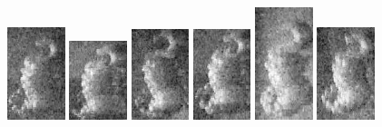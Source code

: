 \begin{figure}            
    \includegraphics[width=0.15\textwidth]{chapters/images/dataset/all-class-images/hook/hook-23.jpg}
    \includegraphics[width=0.15\textwidth]{chapters/images/dataset/all-class-images/hook/hook-32.jpg}    
    \includegraphics[width=0.15\textwidth]{chapters/images/dataset/all-class-images/hook/hook-8.jpg}
    \includegraphics[width=0.15\textwidth]{chapters/images/dataset/all-class-images/hook/hook-26.jpg}
    \includegraphics[width=0.15\textwidth]{chapters/images/dataset/all-class-images/hook/hook-1.jpg}    
    \includegraphics[width=0.15\textwidth]{chapters/images/dataset/all-class-images/hook/hook-14.jpg}
        

\end{figure}
